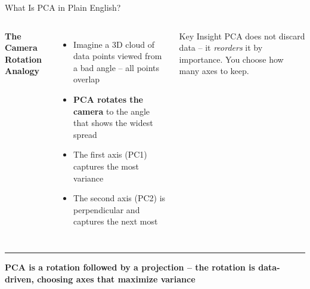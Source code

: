 \documentclass[8pt,aspectratio=169]{beamer}
\newcommand{\bottomnote}[1]{%
\vfill
\vspace{-2mm}
\textcolor{mllavender2}{\rule{\textwidth}{0.4pt}}
\vspace{1mm}
\footnotesize
\textbf{#1}
}
\newenvironment{compactlist}{%
  \begin{itemize}%
    \setlength{\itemsep}{2pt}%
    \setlength{\parskip}{0pt}%
    \setlength{\parsep}{0pt}%
}{%
  \end{itemize}%
}
\newcommand{\highlight}[1]{\textcolor{mlorange}{\textbf{#1}}}
\begin{document}
\begin{frame}[t]{What Is PCA in Plain English?}
\begin{columns}[T]
\small
\textbf{The Camera Rotation Analogy}
\begin{compactlist}
\item Imagine a 3D cloud of data points viewed from a bad angle -- all points overlap
\item \highlight{PCA rotates the camera} to the angle that shows the widest spread
\item The first axis (PC1) captures the most variance
\item The second axis (PC2) is perpendicular and captures the next most
\end{compactlist}

\begin{block}{Key Insight}
\scriptsize PCA does not discard data -- it \emph{reorders} it by importance. You choose how many axes to keep.
\end{block}

\vspace{2mm}
\footnotesize
{}
\end{columns}

\bottomnote{PCA is a rotation followed by a projection -- the rotation is data-driven, choosing axes that maximize variance}
\end{frame}
\end{document}

